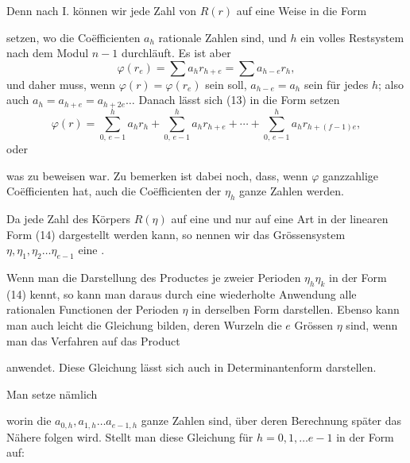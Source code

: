 

Denn nach I. können wir jede Zahl von $R(r)$ auf eine Weise in die Form


setzen, wo die Coëfficienten $a_h$ rationale Zahlen sind, und $h$ ein volles Restsystem nach dem Modul $n - 1$ durchläuft. Es ist aber
\[
\varphi(r_e) = \sum a_h r_{h+e} = \sum a_{h-e} r_h,
\]
und daher muss, wenn $\varphi(r) = \varphi(r_e)$ sein soll, $a_{h-e} = a_h$ sein für jedes $h$; also auch $a_h = a_{h+e} = a_{h+2e} \ldots$ Danach lässt sich (13) in die Form setzen
\[
\varphi(r) = \sum_{0,\,e-1}^{h} a_h r_h + \sum_{0,\,e-1}^{h} a_h r_{h+e} + \cdots + \sum_{0,\,e-1}^{h} a_h r_{h+(f-1)e},
\]
oder


was zu beweisen war. Zu bemerken ist dabei noch, dass, wenn $\varphi$ ganzzahlige Coëfficienten hat, auch die Coëfficienten der $\eta_h$ ganze Zahlen werden.

Da jede Zahl des Körpers $R(\eta)$ auf eine und nur auf eine Art in der linearen Form (14) dargestellt werden kann, so nennen wir das Grössensystem $\eta, \eta_1, \eta_2 \ldots \eta_{e-1}$ eine .

Wenn man die Darstellung des Productes je zweier Perioden $\eta_h \eta_k$ in der Form (14) kennt, so kann man daraus durch eine wiederholte Anwendung alle rationalen Functionen der Perioden $\eta$ in derselben Form darstellen. Ebenso kann man auch leicht die Gleichung bilden, deren Wurzeln die $e$ Grössen $\eta$ sind, wenn man das Verfahren auf das Product


anwendet. Diese Gleichung lässt sich auch in Determinantenform darstellen.

Man setze nämlich


worin die $a_{0,h}, a_{1,h} \ldots a_{e-1,h}$ ganze Zahlen sind, über deren Berechnung später das Nähere folgen wird. Stellt man diese Gleichung für $h = 0, 1, \ldots e - 1$ in der Form auf:
